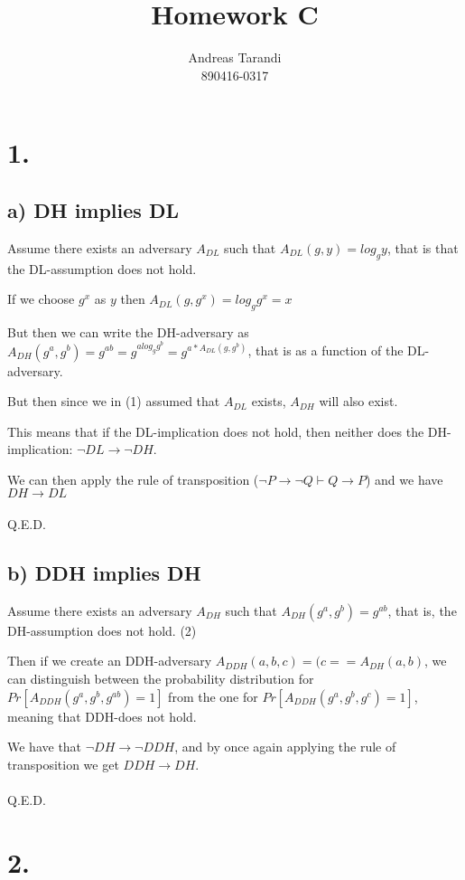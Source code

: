 \documentclass[a4paper,11pt]{article}
\author{Andreas Tarandi\\890416-0317}
\title{Homework C}
\begin{document}
	\maketitle

	\section*{1. }
		\subsection*{a) DH implies DL}
			Assume there exists an adversary $A_{DL}$ such that
			$ A_{DL}(g, y) = log_g{y} $, that is that the DL-assumption does not hold.
		
			If we choose $g^x$ as $y$ then $A_{DL}(g, g^x) = log_g{g^x} = x$

			But then we can write the DH-adversary as $A_{DH}(g^a, g^b) = g^{ab} = g^{a log_g{g^b}} = g^{a * A_{DL}(g, g^b)} $, that is as a function of the DL-adversary. 

			But then since we in (1) assumed that $A_{DL}$ exists, $A_{DH}$ will also exist.

			This means that if the DL-implication does not hold, then neither does the DH-implication: $\neg DL \to \neg DH $. 

			We can then apply the rule of transposition ($\neg P \to \neg Q \vdash Q \to P$) and we have $DH \to DL$ \\
			\\
			Q.E.D.
			
	\subsection*{b) DDH implies DH }
		
	Assume there exists an adversary $A_{DH}$ such that $ A_{DH}(g^a, g^b) = g^{ab}$, that is, the DH-assumption does not hold. (2)

	Then if we create an DDH-adversary $A_{DDH} (a, b, c) = (c == A_{DH} (a, b)$,
	we can distinguish between the probability distribution for $Pr [ A_{DDH}(g^a, g^b, g^{ab}) = 1] $ from the one for $ Pr [ A_{DDH}(g^a, g^b, g^c) = 1 ] $, meaning that DDH-does not hold.

	We have that $\neg DH \to \neg DDH$, and by once again applying the rule of transposition we get $DDH \to DH$. \\
	\\
	Q.E.D.

	\section*{2. }
\end{document}
